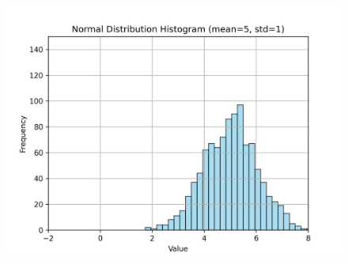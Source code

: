 \documentclass[a4paper,12pt]{article}
\begin{document}
\begin{figure}[h!]
\begin{minipage}{0.2\textwidth}
        \includegraphics[width=\textwidth]{./Screenshots/Exercise6.5.png}
    \end{minipage}
\end{figure}
\newpage
\end{document}
